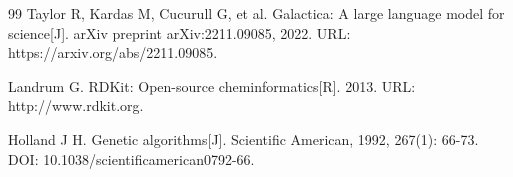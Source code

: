 \begin{thebibliography}{99}
Taylor R, Kardas M, Cucurull G, et al. Galactica: A large language model for science[J]. arXiv preprint arXiv:2211.09085, 2022. URL: https://arxiv.org/abs/2211.09085.

Landrum G. RDKit: Open-source cheminformatics[R]. 2013. URL: http://www.rdkit.org.

Holland J H. Genetic algorithms[J]. Scientific American, 1992, 267(1): 66-73. DOI: 10.1038/scientificamerican0792-66.

\end{thebibliography}
